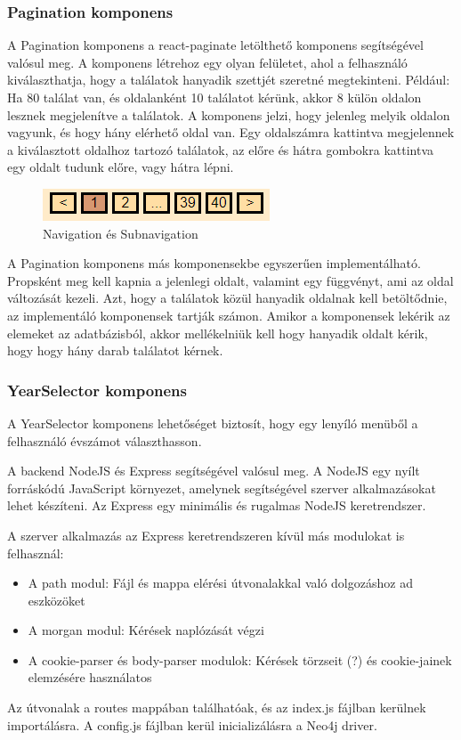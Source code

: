 \subsubsection{Pagination komponens}
A Pagination komponens a react-paginate letölthető komponens segítségével valósul meg. A komponens létrehoz egy olyan felületet, ahol a felhasználó kiválaszthatja, hogy a találatok hanyadik szettjét szeretné megtekinteni. Például: Ha 80 találat van, és oldalanként 10 találatot kérünk, akkor 8 külön oldalon lesznek megjelenítve a találatok. A komponens jelzi, hogy jelenleg melyik oldalon vagyunk, és hogy hány elérhető oldal van. Egy oldalszámra kattintva megjelennek a kiválasztott oldalhoz tartozó találatok, az előre és hátra gombokra kattintva egy oldalt tudunk előre, vagy hátra lépni.

\begin{figure}[H]
    \centering
    \includegraphics[scale=0.7]{images/application/pagination.png}
    \caption{Navigation és Subnavigation}
\end{figure}

A Pagination komponens más komponensekbe egyszerűen implementálható. Propsként meg kell kapnia a jelenlegi oldalt, valamint egy függvényt, ami az oldal változását kezeli. Azt, hogy a találatok közül hanyadik oldalnak kell betöltődnie, az implementáló komponensek tartják számon. Amikor a komponensek lekérik az elemeket az adatbázisból, akkor mellékelniük kell hogy hanyadik oldalt kérik, hogy hogy hány darab találatot kérnek.

\subsubsection{YearSelector komponens}
A YearSelector komponens lehetőséget biztosít, hogy egy lenyíló menüből a felhasználó évszámot választhasson.

A backend NodeJS és Express segítségével valósul meg. A NodeJS egy nyílt forráskódú JavaScript környezet, amelynek segítségével szerver alkalmazásokat lehet készíteni. Az Express egy minimális és rugalmas NodeJS keretrendszer.

\bigskip

A szerver alkalmazás az Express keretrendszeren kívül más modulokat is felhasznál:
\begin{itemize}
    \item A path modul: Fájl és mappa elérési útvonalakkal való dolgozáshoz ad eszközöket
    \item A morgan modul: Kérések naplózását végzi
    \item A cookie-parser és body-parser modulok: Kérések törzseit (?) és cookie-jainek elemzésére használatos
\end{itemize}

Az útvonalak a routes mappában találhatóak, és az index.js fájlban kerülnek importálásra. A config.js fájlban kerül inicializálásra a Neo4j driver.
